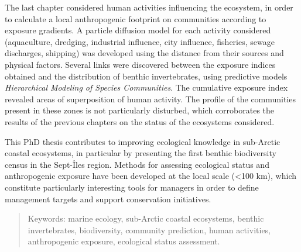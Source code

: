 The last chapter considered human activities influencing the ecosystem,
in order to calculate a local anthropogenic footprint on communities
according to exposure gradients. A particle diffusion model for each
activity considered (aquaculture, dredging, industrial influence, city
influence, fisheries, sewage discharges, shipping) was developed using
the distance from their sources and physical factors. Several links were
discovered between the exposure indices obtained and the distribution of
benthic invertebrates, using predictive models
\textit{Hierarchical Modeling of Species Communities}. The cumulative
exposure index revealed areas of superposition of human activity. The
profile of the communities present in these zones is not particularly
disturbed, which corroborates the results of the previous chapters on
the status of the ecosystems considered.

This PhD thesis contributes to improving ecological knowledge in
sub-Arctic coastal ecosystems, in particular by presenting the first
benthic biodiversity census in the Sept-Îles region. Methods for
assessing ecological status and anthropogenic exposure have been
developed at the local scale (\textless100 km), which constitute
particularly interesting tools for managers in order to define
management targets and support conservation initiatives.

\begin{quote}
Keywords: marine ecology, sub-Arctic coastal ecosystems, benthic
invertebrates, biodiversity, community prediction, human activities,
anthropogenic exposure, ecological status assessment.
\end{quote}
